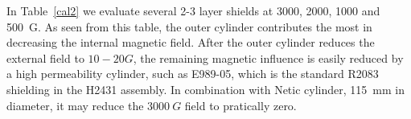 \documentclass[12pt]{article}
\begin{document}
In Table~\ref{cal2} we evaluate several 2-3 layer  shields 
at 3000, 2000, 1000 and 500~G. As seen from this table,  
the outer cylinder contributes the most in decreasing the internal magnetic field.
After the outer cylinder reduces the external field to $10-20G$, the remaining magnetic influence is easily reduced by a high permeability cylinder, such as E989-05, which is the standard R2083 shielding in the H2431 assembly.
In combination with Netic cylinder, 115~mm in diameter,  it may 
reduce the $3000~G$ field to pratically zero.

%
\end{document}
